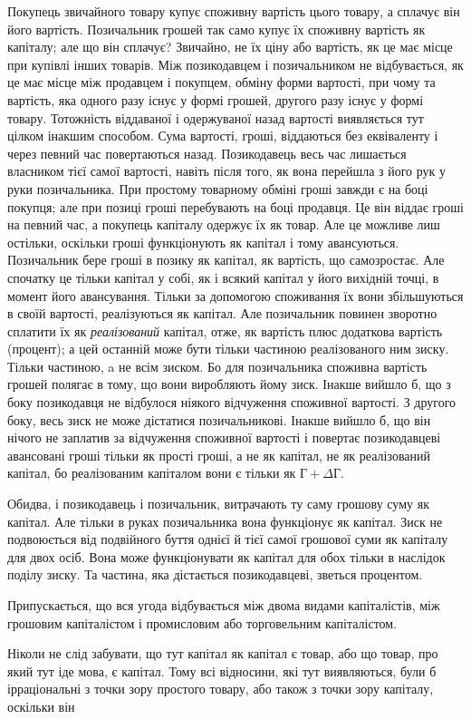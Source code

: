 
Покупець звичайного товару купує споживну вартість цього
товару, а сплачує він його вартість. Позичальник грошей так само
купує їх споживну вартість як капіталу; але що він сплачує?
Звичайно, не їх ціну або вартість, як це має місце при купівлі
інших товарів. Між позикодавцем і позичальником не відбувається,
як це має місце між продавцем і покупцем, обміну форми
вартості, при чому та вартість, яка одного разу існує у формі грошей,
другого разу існує у формі товару. Тотожність віддаваної і
одержуваної назад вартості виявляється тут цілком інакшим способом.
Сума вартості, гроші, віддаються без еквіваленту і через
певний час повертаються назад. Позикодавець весь час
лишається власником тієї самої вартості, навіть після того, як вона
перейшла з його рук у руки позичальника. При простому товарному
обміні гроші завжди є на боці покупця; але при позиці гроші
перебувають на боці продавця. Це він віддає гроші на певний
час, а покупець капіталу одержує їх як товар. Але це можливе
лиш остільки, оскільки гроші функціонують як капітал і тому
авансуються. Позичальник бере гроші в позику як капітал, як
вартість, що самозростає. Але спочатку це тільки капітал у
собі, як і всякий капітал у його вихідній точці, в момент його
авансування. Тільки за допомогою споживання їх вони збільшуються
в своїй вартості, реалізуються як капітал. Але позичальник
повинен зворотно сплатити їх як \emph{реалізований} капітал,
отже, як вартість плюс додаткова вартість (процент); а цей
останній може бути тільки частиною реалізованого ним зиску.
Тільки частиною, a не всім зиском. Бо для позичальника споживна
вартість грошей полягає в тому, що вони виробляють
йому зиск. Інакше вийшло б, що з боку позикодавця не відбулося
ніякого відчуження споживної вартості. З другого боку,
весь зиск не може дістатися позичальникові. Інакше вийшло б,
що він нічого не заплатив за відчуження споживної вартості і
повертає позикодавцеві авансовані гроші тільки як прості гроші,
а не як капітал, не як реалізований капітал, бо реалізованим
капіталом вони є тільки як $Г + ΔГ$.

Обидва, і позикодавець і позичальник, витрачають ту саму
грошову суму як капітал. Але тільки в руках позичальника вона
функціонує як капітал. Зиск не подвоюється від подвійного
буття однієї й тієї самої грошової суми як капіталу для двох
осіб. Вона може функціонувати як капітал для обох тільки в
наслідок поділу зиску. Та частина, яка дістається позикодавцеві,
зветься процентом.

Припускається, що вся угода відбувається між двома видами
капіталістів, між грошовим капіталістом і промисловим або торговельним
капіталістом.

Ніколи не слід забувати, що тут капітал як капітал є товар,
або що товар, про який тут іде мова, є капітал. Тому всі відносини,
які тут виявляються, були б ірраціональні з точки зору
простого товару, або також з точки зору капіталу, оскільки він
\parbreak{}  %
